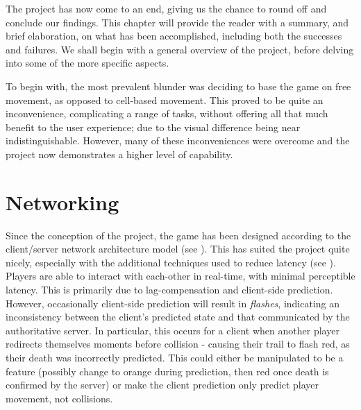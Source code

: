 \documentclass{standalone}
\begin{document}
	The project has now come to an end, giving us the chance to round off and conclude our findings. This chapter will provide the reader with a summary, and brief elaboration, on what has been accomplished, including both the successes and failures. We shall begin with a general overview of the project, before delving into some of the more specific aspects.

	To begin with, the most prevalent blunder was deciding to base the game on free movement, as opposed to cell-based movement. This proved to be quite an inconvenience, complicating a range of tasks, without offering all that much benefit to the user experience; due to the visual difference being near indistinguishable. However, many of these inconveniences were overcome and the project now demonstrates a higher level of capability.

	\section{Networking}
		Since the conception of the project, the game has been designed according to the client/server network architecture model (see ). This has suited the project quite nicely, especially with the additional techniques used to reduce latency (see ). Players are able to interact with each-other in real-time, with minimal perceptible latency. This is primarily due to lag-compensation and client-side prediction. However, occasionally client-side prediction will result in \emph{flashes}, indicating an inconsistency between the client's predicted state and that communicated by the authoritative server. In particular, this occurs for a client when another player redirects themselves moments before collision - causing their trail to flash red, as their death was incorrectly predicted. This could either be manipulated to be a feature (possibly change to orange during prediction, then red once death is confirmed by the server) or make the client prediction only predict player movement, not collisions.
\end{document}
